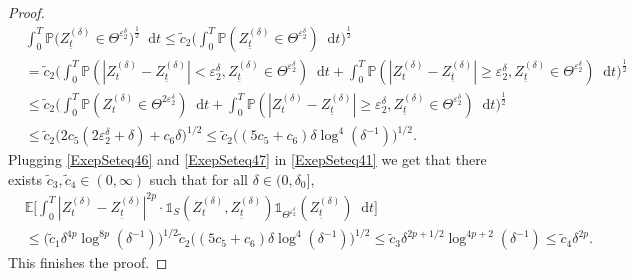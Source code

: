 \documentclass[11pt,a4paper]{article}
\numberwithin{equation}{section}
\theoremstyle{definition}
\newcommand{\E}{{\mathbb{E}}}
\renewcommand{\P}{{\mathbb{P}}}
\newcommand{\diff}{\mathop{}\!\mathrm{d}}
\begin{document}
\begin{proof}
    \begin{equation}\label{ExepSeteq47}
        \begin{aligned}
            &\int_0^T \P\big(  Z_{\underline t}^{(\delta)} \in \Theta^{\varepsilon_2^\delta}\big)^{\frac{1}{2}} \diff t
            \leq \widetilde c_2 \Big(\int_0^T \P(  Z_{\underline t}^{(\delta)} \in \Theta^{\varepsilon_2^\delta}) \diff t\Big)^{\frac{1}{2}}\\
            &= \widetilde c_2\Big(\int_0^T \P(|Z_{t}^{(\delta)} - Z_{\underline t}^{(\delta)}| <\varepsilon_2^\delta,   Z_{\underline t}^{(\delta)} \in \Theta^{\varepsilon_2^\delta}) \diff t + \int_0^T \P(|Z_{t}^{(\delta)} - Z_{\underline t}^{(\delta)}| \geq \varepsilon_2^\delta,   Z_{\underline t}^{(\delta)} \in \Theta^{\varepsilon_2^\delta}) \diff t \Big)^{\frac{1}{2}}\\
            &\leq \widetilde c_2 \Big(\int_0^T \P(Z_{t}^{(\delta)} \in \Theta^{2\varepsilon_2^\delta}) \diff t + \int_0^T \P(|Z_{t}^{(\delta)} - Z_{\underline t}^{(\delta)}| \geq \varepsilon_2^\delta,   Z_{\underline t}^{(\delta)} \in \Theta^{\varepsilon_2^\delta}) \diff t \Big)^{\frac{1}{2}}\\
            &\leq \widetilde c_2\big( 2c_5 (2 \varepsilon_2^\delta +\delta) + c_6 \delta\big)^{1/2}
            \leq \widetilde c_2 \big((5c_5 +c_6) \delta \log^4(\delta^{-1})\big)^{1/2}.
        \end{aligned} 
    \end{equation}
    Plugging \eqref{ExepSeteq46} and \eqref{ExepSeteq47} in \eqref{ExepSeteq41} we get that there exists $\widetilde c_3, \widetilde c_4 \in(0,\infty)$ such that for all $\delta\in(0,\delta_0]$,
    \begin{equation}\label{ExepSeteq48}
        \begin{aligned}
            &\E\Big[\int_0^T  |Z_{t}^{(\delta)} - Z_{\underline t}^{(\delta)}|^{2p}\cdot \mathds{1}_{S}(Z_{t}^{(\delta)},Z_{\underline t}^{(\delta)}) \mathds{1}_{\Theta^{\varepsilon_2^\delta}}(Z_{\underline t}^{(\delta)}) \diff t \Big]\\
            &\leq \big(\widetilde c_1 \delta^{4p} \log^{8p}(\delta^{-1})\big)^{1/2} \widetilde c_2 \big( (5c_5 +c_6) \delta \log^4(\delta^{-1}) \big)^{1/2}
            \leq \widetilde c_3 \delta^{2p+1/2} \log^{4p+2}(\delta^{-1}) \leq \widetilde c_4 \delta^{2p}.
        \end{aligned} 
    \end{equation}
    This finishes the proof.
\end{proof}
\end{document}
